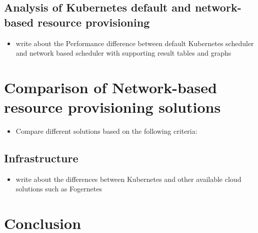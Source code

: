 \subsection{Analysis of Kubernetes default and network-based resource provisioning}
\label{sec:analysis}
\begin{itemize}
  \item write about the Performance difference between default Kubernetes scheduler and network based scheduler with supporting result tables and graphs
\end{itemize}

\section{Comparison of Network-based resource provisioning solutions}
\label{sec:related_work}
\begin{itemize}
  \item Compare different solutions based on the following criteria:
\end{itemize}

\subsection{Infrastructure}
\label{sec:infra}
\begin{itemize}
  \item write about the differences between Kubernetes and other available cloud solutions such as Fogernetes\cite{Wobker2018} 
\end{itemize}

\section{Conclusion}
\label{sec:concl}
